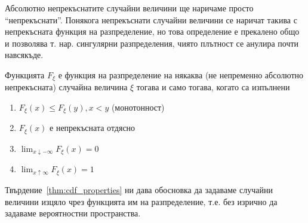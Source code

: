 \documentclass[numbers=endperiod, bibliography=totocnumbered]{scrartcl}
\begin{document}
\begin{note}
  Абсолютно непрекъснатите случайни величини ще наричаме просто \enquote{непрекъснати}. Понякога непрекъснати случайни величини се наричат такива с непрекъсната функция на разпределение, но това определение е прекалено общо и позволява т. нар. сингулярни разпределения, чиято плътност се анулира почти навсякъде.
\end{note}

\begin{proposition}\label{thm:cdf_properties}
  Функцията \( F_\xi \) е функция на разпределение на някаква (не непременно абсолютно непрекъсната) случайна величина \( \xi \) тогава и само тогава, когато са изпълнени
  \begin{enumerate}
    \item \( F_\xi(x) \leq F_\xi(y), x < y \) (монотонност)
    \item \( F_\xi(x) \) е непрекъсната отдясно
    \item \( \lim_{x \downarrow -\infty} F_\xi(x) = 0 \)
    \item \( \lim_{x \uparrow \infty} F_\xi(x) = 1 \)
  \end{enumerate}
\end{proposition}

Твърдение~\ref{thm:cdf_properties} ни дава обосновка да задаваме случайни величини изцяло чрез функцията им на разпределение, т.е. без изрично да задаваме вероятностни пространства.
\end{document}
